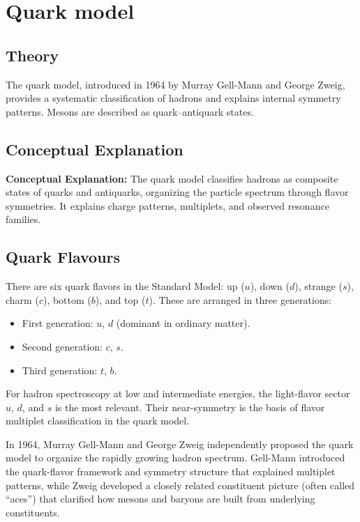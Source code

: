 \documentclass[12pt]{report}
\begin{document}
\section{Quark model}



\subsection{Theory}
The quark model, introduced in 1964 by Murray Gell-Mann and George Zweig, provides a systematic classification of hadrons and explains internal symmetry patterns. Mesons are described as quark--antiquark states.


\subsection{Conceptual Explanation}
\textbf{Conceptual Explanation:} The quark model classifies hadrons as composite states of quarks and antiquarks, organizing the particle spectrum through flavor symmetries. It explains charge patterns, multiplets, and observed resonance families.


\subsection{Quark Flavours}
There are six quark flavors in the Standard Model: up ($u$), down ($d$), strange ($s$), charm ($c$), bottom ($b$), and top ($t$). These are arranged in three generations:
\begin{itemize}
    \item First generation: $u$, $d$ (dominant in ordinary matter).
    \item Second generation: $c$, $s$.
    \item Third generation: $t$, $b$.
\end{itemize}
For hadron spectroscopy at low and intermediate energies, the light-flavor sector $u$, $d$, and $s$ is the most relevant. Their near-symmetry is the basis of flavor multiplet classification in the quark model.

In 1964, Murray Gell-Mann and George Zweig independently proposed the quark model to organize the rapidly growing hadron spectrum. Gell-Mann introduced the quark-flavor framework and symmetry structure that explained multiplet patterns, while Zweig developed a closely related constituent picture (often called ``aces'') that clarified how mesons and baryons are built from underlying constituents.
\end{document}
